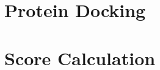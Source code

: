 \documentclass[11pt]{article}
\begin{document}
\date{\today}

\section{Protein Docking}

\section{Score Calculation}
\begin{lstlisting}

\end{lstlisting}
\end{document}
